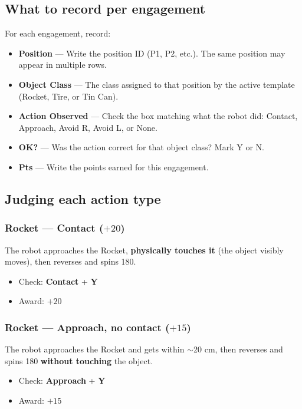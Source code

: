 \documentclass[a4]{article}
\begin{document}
\subsection*{What to record per engagement}

For each engagement, record:
\begin{itemize}
    \item \textbf{Position} --- Write the position ID (P1, P2, etc.). The same position may appear in multiple rows.
    \item \textbf{Object Class} --- The class assigned to that position by the active template (Rocket, Tire, or Tin Can).
    \item \textbf{Action Observed} --- Check the box matching what the robot did: Contact, Approach, Avoid R, Avoid L, or None.
    \item \textbf{OK?} --- Was the action correct for that object class? Mark Y or N.
    \item \textbf{Pts} --- Write the points earned for this engagement.
\end{itemize}

\subsection*{Judging each action type}

\subsubsection*{Rocket --- Contact ($+20$)}
The robot approaches the Rocket, \textbf{physically touches it} (the object visibly moves), then reverses and spins 180\textdegree.
\begin{itemize}
    \item Check: \textbf{Contact} + \textbf{Y}
    \item Award: $+20$
\end{itemize}

\subsubsection*{Rocket --- Approach, no contact ($+15$)}
The robot approaches the Rocket and gets within $\sim$20 cm, then reverses and spins 180\textdegree{} \textbf{without touching} the object.
\begin{itemize}
    \item Check: \textbf{Approach} + \textbf{Y}
    \item Award: $+15$
\end{itemize}
\end{document}
